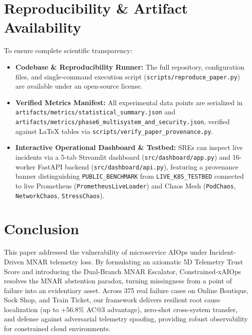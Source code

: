 \documentclass[conference]{IEEEtran}
\begin{document}
\section{Reproducibility \& Artifact Availability}
To ensure complete scientific transparency:
\begin{itemize}
    \item \textbf{Codebase \& Reproducibility Runner:} The full repository, configuration files, and single-command execution script (\texttt{scripts/reproduce\_paper.py}) are available under an open-source license.
    \item \textbf{Verified Metrics Manifest:} All experimental data points are serialized in \texttt{artifacts/metrics/statistical\_summary.json} and \texttt{artifacts/metrics/phase6\_multisystem\_and\_security.json}, verified against LaTeX tables via \texttt{scripts/verify\_paper\_provenance.py}.
    \item \textbf{Interactive Operational Dashboard \& Testbed:} SREs can inspect live incidents via a 5-tab Streamlit dashboard (\texttt{src/dashboard/app.py}) and 16-worker FastAPI backend (\texttt{src/dashboard/api.py}), featuring a provenance banner distinguishing \texttt{PUBLIC\_BENCHMARK} from \texttt{LIVE\_K8S\_TESTBED} connected to live Prometheus (\texttt{PrometheusLiveLoader}) and Chaos Mesh (\texttt{PodChaos}, \texttt{NetworkChaos}, \texttt{StressChaos}).
\end{itemize}

\section{Conclusion}
This paper addressed the vulnerability of microservice AIOps under Incident-Driven MNAR telemetry loss.
By formulating an axiomatic 5D Telemetry Trust Score and introducing the Dual-Branch MNAR Escalator, Constrained-xAIOps resolves the MNAR abstention paradox, turning missingness from a point of failure into an evidentiary asset.
Across 375 real failure cases on Online Boutique, Sock Shop, and Train Ticket, our framework delivers resilient root cause localization (up to +56.8\% AC@3 advantage), zero-shot cross-system transfer, and defense against adversarial telemetry spoofing, providing robust observability for constrained cloud environments.



\end{document}
